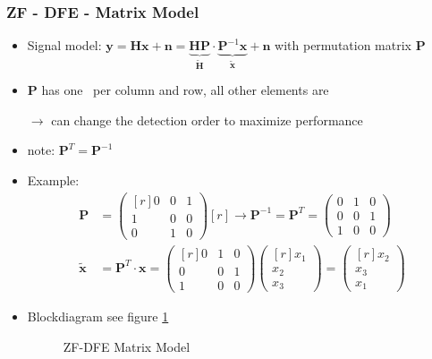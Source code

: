\documentclass[a4paper, 10pt]{article}
\begin{document}
\subsubsection{ZF - DFE - Matrix Model}
\begin{itemize}
	\item Signal model: $ \mathbf{y} = \mathbf{Hx} + \mathbf{n} = \underbrace{\mathbf{HP}}_{\tilde{\mathbf{H}}}\cdot\underbrace{\mathbf{P}^{-1}\mathbf{x}}_{\tilde{\mathbf{x}}} + \mathbf{n} $ with permutation matrix $\mathbf{P} $
	\item $\mathbf{P} $ has one \grqq\, per column and row, all other elements are \grqq 
	\item[$\rightarrow$] can change the detection order to maximize performance
	\item note: $\mathbf{P}^T = \mathbf{P}^{-1} $
	\item Example: 
	\begin{align*}
		\mathbf{P} &= \begin{pmatrix*}[r] 0 & 0 & 1\\1 & 0 & 0\\ 0 & 1 & 0	\end{pmatrix*}[r] \rightarrow \mathbf{P}^{-1} = \mathbf{P}^T = \begin{pmatrix*}0 & 1 & 0\\0 & 0 & 1\\ 1 & 0 & 0\end{pmatrix*}\\
		\tilde{\mathbf{x}} &= \mathbf{P}^T\cdot\mathbf{x} = \begin{pmatrix*}[r] 0 & 1 & 0\\ 0 & 0 & 1\\ 1 & 0 & 0\end{pmatrix*}\begin{pmatrix*}[r]x_1 \\x_2\\x_3\end{pmatrix*} = \begin{pmatrix*}[r]x_2\\x_3\\x_1\end{pmatrix*}
	\end{align*}
	\item Blockdiagram see figure \ref{ZF-DFE-Matrix}
	\begin{figure}
		\centering
		\caption{ZF-DFE Matrix Model}
		\label{ZF-DFE-Matrix}

\end{figure}
\end{itemize}
\end{document}
